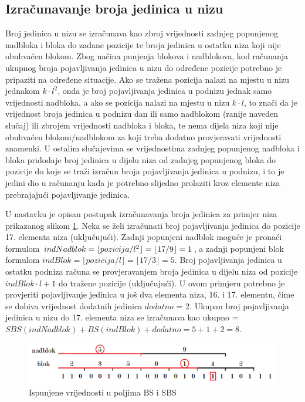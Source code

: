 \subsection{Izračunavanje broja jedinica u nizu}
Broj jedinica u nizu se izračunava kao zbroj vrijednosti zadnjeg popunjenog nadbloka i bloka do zadane pozicije te broja jedinica u ostatku niza koji nije obuhvaćen blokom. Zbog načina punjenja blokova i nadblokova, kod računanja ukupnog broja pojavljivanja jedinica u nizu do određene pozicije potrebno je pripaziti na određene situacije. Ako se tražena pozicija nalazi na mjestu u nizu jednakom $k\cdot l^2$, onda je broj pojavljivanja jedinica u podnizu jednak samo vrijednosti nadbloka, a ako se pozicija nalazi na mjestu u nizu $k\cdot l$, to znači da je vrijednost broja jedinica u podnizu dan ili samo nadblokom (ranije naveden slučaj) ili zbrojem vrijednosti nadbloka i bloka, te nema dijela niza koji nije obuhvaćen blokom/nadblokom za koji treba dodatno provjeravati vrijednosti znamenki. U ostalim slučajevima se vrijednostima zadnjeg popunjenog nadbloka i bloka pridodaje broj jedinica u dijelu niza od zadnjeg popunjenog bloka do pozicije do koje se traži izračun broja pojavljivanja jedinica u podnizu, i to je jedini dio u računanju kada je potrebno slijedno prolaziti kroz elemente niza prebrajajući pojavljivanje jedinica.

U nastavku je opisan postupak izračunavanja broja jedinica za primjer niza prikazanog slikom \ref{rrr2}. Neka se želi izračunati broj pojavljivanja jedinica do pozicije 17. elementa niza (uključujući). Zadnji popunjeni nadblok moguće je pronaći formulom $indNadblok = \linebreak \lfloor pozicija/l^2 \rfloor = \lfloor 17/9 \rfloor = 1$, a zadnji popunjeni blok formulom $indBlok = \lfloor pozicija/l \rfloor = \lfloor 17/3 \rfloor = 5$. Broj pojavljivanja jedinica u ostatku podniza računa se provjeravanjem broja jedinica u dijelu niza od pozicije $indBlok\cdot l+1$ do tražene pozicije (uključujući). U ovom primjeru potrebno je provjeriti pojavljivanje jedinica u još dva elementa niza, 16. i 17. elementu, čime se dobiva vrijednost dodatnih jedinica $dodatno$ = 2. Ukupan broj pojavljivanja jedinica u nizu do 17. elementa niza se izračunava kao ukupno  = $SBS(indNadblok) + BS(indBlok) + dodatno = 5 + 1 + 2 = 8$.

\begin{figure}[H]
\centering
\includegraphics[width=\linewidth]{./pictures/rrr2.png}
\caption{Ispunjene vrijednosti u poljima BS i SBS}\label{rrr2}
\end{figure}
























